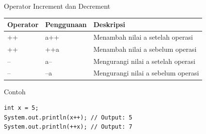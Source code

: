 \documentclass{beamer}
\begin{document}
\begin{frame}[fragile]{Operator Increment dan Decrement}
  \begin{table}
  \scriptsize
  \begin{tabular}{|l|l|l|}
  \hline
  \textbf{Operator} & \textbf{Penggunaan} & \textbf{Deskripsi} \\
  \hline
  ++ & a++ & Menambah nilai a setelah operasi \\
  ++ & ++a & Menambah nilai a sebelum operasi \\
  -- & a-- & Mengurangi nilai a setelah operasi \\
  -- & --a & Mengurangi nilai a sebelum operasi \\
  \hline
  \end{tabular}
  \end{table}
  
  \begin{exampleblock}{Contoh}
\begin{lstlisting}
int x = 5;
System.out.println(x++); // Output: 5
System.out.println(++x); // Output: 7
\end{lstlisting}
  \end{exampleblock}
\end{frame}
\end{document}
